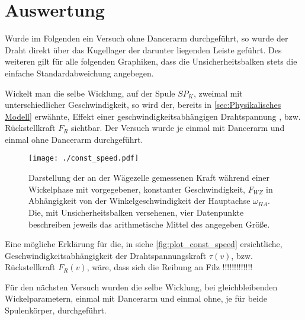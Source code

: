 \section{Auswertung}
\label{sec:Auswertung}

Wurde im Folgenden ein Versuch ohne Dancerarm durchgeführt, so wurde der Draht direkt über das Kugellager der darunter liegenden Leiste geführt. Des weiteren gilt für alle folgenden Graphiken, dass die Unsicherheitsbalken stets die einfache Standardabweichung angebegen.\newline


Wickelt man die selbe Wicklung, auf der Spule $SP_K$, zweimal mit unterschiedlicher Geschwindigkeit, so wird der, bereits in \autoref{sec:Physikalisches Modell} erwähnte, Effekt einer geschwindigkeitsabhängigen Drahtspannung , bzw. Rückstellkraft $F_R$ sichtbar. Der Versuch wurde je einmal mit Dancerarm und einmal ohne Dancerarm durchgeführt.

\begin{figure}[H]
    \centering
    \texttt{[image: ./const\_speed.pdf]}
    \caption{Darstellung der an der Wägezelle gemessenen Kraft während einer Wickelphase mit vorgegebener, konstanter Geschwindigkeit, $F_{WZ}$ in Abhängigkeit von der Winkelgeschwindigkeit der Hauptachse $\omega_{HA}$. Die, mit Unsicherheitsbalken versehenen, vier Datenpunkte beschreiben jeweils das arithmetische Mittel des angegeben Größe.}
    \label{fig:plot_const_speed}
\end{figure}

Eine mögliche Erklärung für die, in siehe \autoref{fig:plot_const_speed} ersichtliche, Geschwindigkeitsabhängigkeit der Drahtspannungskraft $\tau(v)$, bzw. Rückstellkraft $F_R(v)$, wäre, dass sich die Reibung an Filz !!!!!!!!!!!!! \newline


Für den nächsten Versuch wurden die selbe Wicklung, bei gleichbleibenden Wickelparametern, einmal mit Dancerarm und einmal ohne, je für beide Spulenkörper, durchgeführt. 




